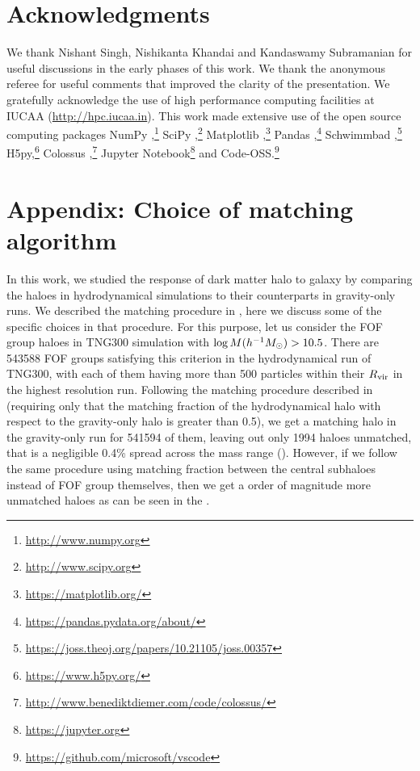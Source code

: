 \section*{Acknowledgments}
We thank Nishant Singh, Nishikanta Khandai and Kandaswamy Subramanian for useful discussions in the early phases of this work.
We thank the anonymous referee for useful comments that improved the clarity of the presentation.
We gratefully acknowledge the use of high performance computing facilities at IUCAA (\url{http://hpc.iucaa.in}). This work made extensive use of the open source computing packages NumPy \citep{vanderwalt-numpy},\footnote{\url{http://www.numpy.org}} SciPy \citep{scipy},\footnote{\url{http://www.scipy.org}} Matplotlib \citep{hunter07_matplotlib},\footnote{\url{https://matplotlib.org/}} Pandas \citep[][]{reback2020pandas},\footnote{\url{https://pandas.pydata.org/about/}} Schwimmbad \citep{schwimmbad},\footnote{\url{https://joss.theoj.org/papers/10.21105/joss.00357}} H5py,\footnote{\url{https://www.h5py.org/}} Colossus \citep{colossus},\footnote{\url{http://www.benediktdiemer.com/code/colossus/}}  Jupyter Notebook\footnote{\url{https://jupyter.org}} and Code-OSS.\footnote{\url{https://github.com/microsoft/vscode}}



% 

\section{Appendix: Choice of matching algorithm}
\label{sec:apndx-matching-ch:z0main}
In this work, we studied the response of dark matter halo to galaxy by comparing the haloes in hydrodynamical simulations to their counterparts in gravity-only runs. We described the matching procedure in , here we discuss some of the specific choices in that procedure.
For this purpose, let us consider the FOF group haloes in TNG300 simulation with $\log M(h^{-1}M_{\odot})>10.5$.  There are 543588 FOF groups satisfying this criterion in the hydrodynamical run of TNG300, with each of them having more than 500 particles within their $R_{\rm vir}$ in the highest resolution run.
Following the matching procedure described in  (requiring only that the matching fraction of the hydrodynamical halo with respect to the gravity-only halo is greater than 0.5), we get a matching halo in the gravity-only run for 541594 of them, leaving out only 1994 haloes unmatched, that is a negligible 0.4\% spread across the mass range ().
However, if we follow the same procedure using matching fraction between the central subhaloes instead of FOF group themselves, then we get a order of magnitude more unmatched haloes as can be seen in the .  

